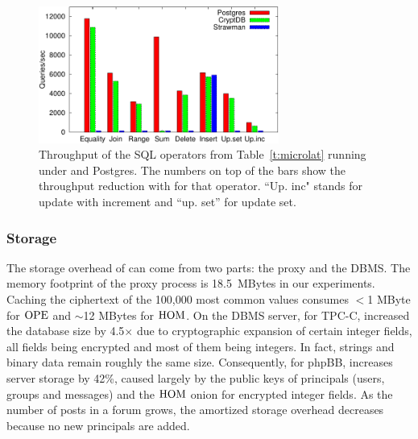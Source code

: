 \begin{figure}[t!] 
\centering
\includegraphics[width=3.1in]{fig/microbars.pdf} 
\caption{Throughput of the SQL operators from Table~\ref{t:microlat}
  running under \name and Postgres. The numbers on top of the bars
  show the throughput reduction with \name{} for that operator. ``Up. inc" stands for update with increment and ``up. set'' for update set.}
\label{fig:microtput}
\end{figure}


\subsubsection{Storage}

The storage overhead of \name can come from two parts: the proxy
and the DBMS\@.
The memory footprint of the \name{} proxy process is
18.5~MBytes in our experiments.
Caching the ciphertext of the 100,000 most common values consumes
$<$1 MByte for $\textrm{OPE}$ and $\sim$12 MBytes for $\textrm{HOM}$.  On the DBMS
server, for TPC-C, \name{} increased the database size by 4.5$\times$
due to cryptographic expansion of certain integer fields, all fields being encrypted and most of them being integers. In fact, strings and
binary data remain roughly the same size. Consequently,
for phpBB, \name{} increases server storage by 42\%, caused largely
by the public keys of principals (users, groups and messages) and the
$\textrm{HOM}$ onion for encrypted integer fields.
As the number of posts in a forum grows, the amortized storage overhead
decreases because no new principals are added.


